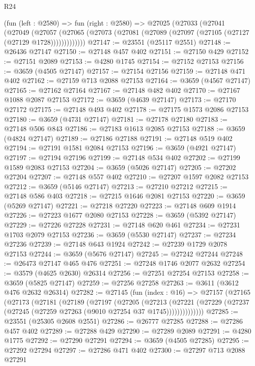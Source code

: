 \begin{lexlean}{R24}
\begin{coremodule}
    (fun (left : @2580) =>
    fun (right : @2580) =>
    @27025
      (@27033
        (@27041
          (@27049
            (@27057
              (@27065 (@27073 (@27081 (@27089 (@27097 (@27105 (@27127 (@27129 @1728)))))))))))))
@27147 := @23551 (@25117 @2551)
@27148 := @26436 @27147
@27150 := @27148 @457 @402
@27151 := @27150 @429
@27152 := @27151 @2089
@27153 := @4280 @1745
@27154 := @27152 @27153
@27156 := @3659 (@4505 @27147)
@27157 := @27154 @27156
@27159 := @27148 @471 @402
@27162 := @27159 @713 @2088 @27153
@27164 := @3659 (@4567 @27147)
@27165 := @27162 @27164
@27167 := @27148 @482 @402
@27170 := @27167 @1088 @2087 @27153
@27172 := @3659 (@4639 @27147)
@27173 := @27170 @27172
@27175 := @27148 @493 @402
@27178 := @27175 @1573 @2086 @27153
@27180 := @3659 (@4731 @27147)
@27181 := @27178 @27180
@27183 := @27148 @506 @843
@27186 := @27183 @1613 @2085 @27153
@27188 := @3659 (@4824 @27147)
@27189 := @27186 @27188
@27191 := @27148 @519 @402
@27194 := @27191 @1581 @2084 @27153
@27196 := @3659 (@4921 @27147)
@27197 := @27194 @27196
@27199 := @27148 @534 @402
@27202 := @27199 @1589 @2083 @27153
@27204 := @3659 (@5026 @27147)
@27205 := @27202 @27204
@27207 := @27148 @557 @402
@27210 := @27207 @1597 @2082 @27153
@27212 := @3659 (@5146 @27147)
@27213 := @27210 @27212
@27215 := @27148 @586 @403
@27218 := @27215 @1646 @2081 @27153
@27220 := @3659 (@5269 @27147)
@27221 := @27218 @27220
@27223 := @27148 @609 @1914
@27226 := @27223 @1677 @2080 @27153
@27228 := @3659 (@5392 @27147)
@27229 := @27226 @27228
@27231 := @27148 @620 @461
@27234 := @27231 @1703 @2079 @27153
@27236 := @3659 (@5530 @27147)
@27237 := @27234 @27236
@27239 := @27148 @643 @1924
@27242 := @27239 @1729 @2078 @27153
@27244 := @3659 (@5676 @27147)
@27245 := @27242 @27244
@27248 := @26473 @27147 @465 @476
@27251 := @27248 @1746 @2077 @2632
@27254 := @3579 (@4625 @2630) @26314
@27256 := @27251 @27254 @27153
@27258 := @3659 (@5825 @27147)
@27259 := @27256 @27258
@27263 := @3611 (@3612 @476 @2632 @26314)
@27282 := @27145
    (fun (index : @16) =>
    @27157
      (@27165
        (@27173
          (@27181
            (@27189
              (@27197
                (@27205
                  (@27213
                    (@27221
                      (@27229 (@27237 (@27245 (@27259 @27263 (@9010 @27254 @37 @1745))))))))))))))
@27285 := @23551 (@25305 @2608 @2551)
@27286 := @26777 @27285
@27288 := @27286 @457 @402
@27289 := @27288 @429
@27290 := @27289 @2089
@27291 := @4280 @1775
@27292 := @27290 @27291
@27294 := @3659 (@4505 @27285)
@27295 := @27292 @27294
@27297 := @27286 @471 @402
@27300 := @27297 @713 @2088 @27291

\end{coremodule}
\end{lexlean}

